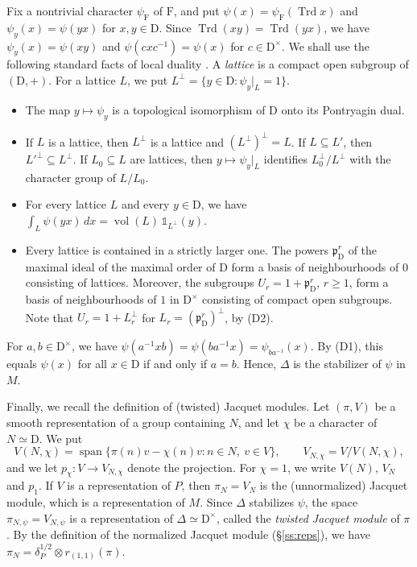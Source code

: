 \documentclass[11pt]{amsart}
\numberwithin{equation}{section}
\theoremstyle{plain}
\theoremstyle{definition}
\theoremstyle{remark}
\newcommand{\one}{\mathds{1}}
\DeclareMathOperator{\Trd}{Trd}
\DeclareMathOperator{\vol}{vol}
\begin{document}
Fix a nontrivial character $\psi_{\mathrm{F}}$ of $\mathrm{F}$, and put $\psi(x)=\psi_{\mathrm{F}}(\Trd x)$ and $\psi_y(x)=\psi(yx)$ for $x,y\in \mathrm{D}$. Since $\Trd(xy)=\Trd(yx)$, we have $\psi_y(x)=\psi(xy)$ and $\psi(cxc^{-1})=\psi(x)$ for $c\in\mathrm{D}^\times$. We shall use the following standard facts of local duality \cite[Ch.~II]{Wei74}. A \emph{lattice} is a compact open subgroup of $(\mathrm{D},+)$. For a lattice $L$, we put $L^\perp=\{y\in \mathrm{D}:\psi_y|_L=1\}$.
\begin{itemize}
	\item[(D1)] The map $y\mapsto\psi_y$ is a topological isomorphism of $\mathrm{D}$ onto its Pontryagin dual.
	\item[(D2)] If $L$ is a lattice, then $L^\perp$ is a lattice and $(L^\perp)^\perp=L$. If $L\subseteq L'$, then $L'^\perp\subseteq L^\perp$. If $L_0\subseteq L$ are lattices, then $y\mapsto\psi_y|_L$ identifies $L_0^\perp/L^\perp$ with the character group of $L/L_0$.
	\item[(D3)] For every lattice $L$ and every $y\in\mathrm{D}$, we have $\int_L\psi(yx)\,dx=\vol(L)\,\one_{L^\perp}(y)$.
	\item[(D4)] Every lattice is contained in a strictly larger one. The powers $\mathfrak p_{\mathrm{D}}^r$ of the maximal ideal of the maximal order of $\mathrm{D}$ form a basis of neighbourhoods of $0$ consisting of lattices. Moreover, the subgroups $U_r=1+\mathfrak p_{\mathrm{D}}^r$, $r\ge1$, form a basis of neighbourhoods of $1$ in $\mathrm{D}^\times$ consisting of compact open subgroups. Note that $U_r=1+L_r^\perp$ for $L_r=(\mathfrak p_{\mathrm{D}}^r)^\perp$, by (D2).
\end{itemize}
For $a,b\in\mathrm{D}^\times$, we have $\psi(a^{-1}xb)=\psi(ba^{-1}x)=\psi_{ba^{-1}}(x)$. By (D1), this equals $\psi(x)$ for all $x\in\mathrm{D}$ if and only if $a=b$. Hence, $\Delta$ is the stabilizer of $\psi$ in $M$.

Finally, we recall the definition of (twisted) Jacquet modules. Let $(\pi,V)$ be a smooth representation of a group containing $N$, and let $\chi$ be a character of $N\simeq \mathrm{D}$. We put
$$
V(N,\chi)=\operatorname{span}\{\pi(n)v-\chi(n)v:n\in N,\ v\in V\},\qquad V_{N,\chi}=V/V(N,\chi),
$$
and we let $p_\chi\colon V\to V_{N,\chi}$ denote the projection. For $\chi=1$, we write $V(N)$, $V_N$ and $p_1$. If $V$ is a representation of $P$, then $\pi_N=V_N$ is the (unnormalized) Jacquet module, which is a representation of $M$. Since $\Delta$ stabilizes $\psi$, the space $\pi_{N,\psi}=V_{N,\psi}$ is a representation of $\Delta\simeq \mathrm{D}^\times$, called the \emph{twisted Jacquet module} of $\pi$. By the definition of the normalized Jacquet module (\S\ref{ss:reps}), we have $\pi_N=\delta_P^{1/2}\otimes r_{(1,1)}(\pi)$.
\end{document}
